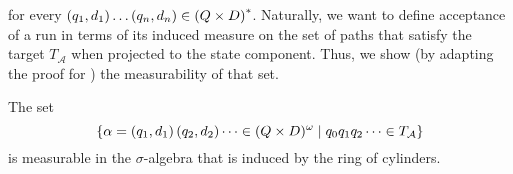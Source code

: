 for every $\left(q_{1},d_{1}\right)\dots\left(q_{n},d_{n}\right)\in\left(Q\times D\right)^{*}$.
Naturally, we want to define acceptance of a run in terms of its induced
measure on the set of paths that satisfy the target $T_{\mathcal{A}}$ when
projected to the state component. Thus, we show (by adapting the proof for
\cite[Proposition 6]{RandAutoInfTrees}) the measurability of that set.
\begin{lemma}[Measurability]
  The set
  \begin{equation*}
    \left\{\alpha = \left(q_{1},d_{1}\right)\left(q_{2},d_{2}\right)\dots\in
    (Q\times D)^{\omega}\mid q_{0}q_{1}q_{2}\dots\in T_{\mathcal{A}}\right\}
  \end{equation*} is measurable in the $\sigma$-algebra that is induced by the
  ring of cylinders.
  \label{lem:measureabilityAcceptance}
\end{lemma}
